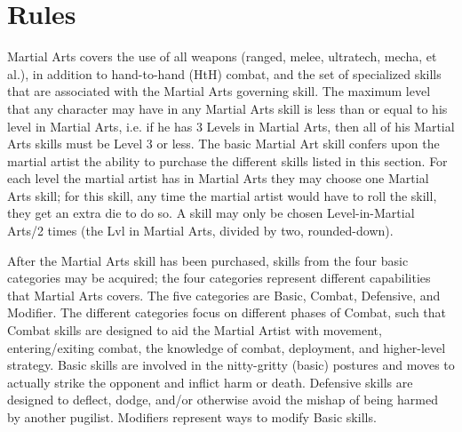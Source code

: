 \documentclass[twoside]{book}
\begin{document}
    

\section{Rules}
      Martial Arts covers the use of all weapons (ranged,
             melee, ultratech, mecha, et al.), in addition to
             hand-to-hand (HtH) combat, and the set of specialized skills
             that are associated with the Martial Arts governing skill.
             The maximum level that any character may have in any Martial
             Arts skill is less than or equal to his level in Martial
             Arts, i.e. if he has 3 Levels in Martial Arts, then all of
             his Martial Arts skills must be Level 3 or less. The basic
             Martial Art skill confers upon the martial artist the
             ability to purchase the different skills listed in this
             section.   For each level the martial artist has in Martial Arts
             they may choose one Martial Arts skill; for this skill, any
             time the martial artist would have to roll the skill, they
             get an extra die to do so. A skill may only be chosen
             Level-in-Martial Arts/2 times (the Lvl in Martial Arts,
             divided by two, rounded-down). 
  

  

    After the Martial Arts skill has been purchased,
             skills from the four basic categories may be acquired; the
             four categories represent different capabilities that
             Martial Arts covers. The five categories are Basic, Combat,
             Defensive, and Modifier. The different categories focus on
             different phases of Combat, such that Combat skills are
             designed to aid the Martial Artist with movement,
             entering/exiting combat, the knowledge of combat,
             deployment, and higher-level strategy. Basic skills are
             involved in the nitty-gritty (basic) postures and moves to
             actually strike the opponent and inflict harm or death.
             Defensive skills are designed to deflect, dodge, and/or
             otherwise avoid the mishap of being harmed by another
             pugilist. Modifiers represent ways to modify Basic skills.
             
\end{document}
